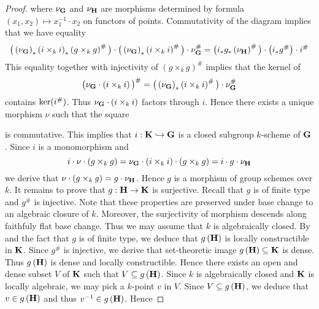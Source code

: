 \begin{proof}
where $\nu_{\mathbf{G}}$ and $\nu_{\mathbf{H}}$ are morphisms determined by formula $(x_1,x_2)\mapsto x_1^{-1}\cdot x_2$ on functors of points. Commutativity of the diagram implies that we have equality
$$\big(\left(\nu_{\mathbf{G}}\right)_*\left(i\times_k i\right)_*\left(g\times_k g\right)^{\#}\big) \cdot \big(\left(\nu_{\mathbf{G}}\right)_*\left(i\times_k i\right)^{\#} \big) \cdot \nu_{\mathbf{G}}^{\#} = \big(i_*g_* \left(\nu_{\mathbf{H}}\right)^{\#} \big) \cdot \big(i_*g^{\#} \big) \cdot i^{\#}$$
This equality together with injectivity of $\left(g\times_k g\right)^{\#}$ implies that the kernel of
$$\big(\nu_{\mathbf{G}}\cdot \left(i\times_k i\right)\big)^{\#} = \big(\left(\nu_{\mathbf{G}}\right)_*\left(i\times_k i\right)^{\#} \big) \cdot \nu_{\mathbf{G}}^{\#}$$
contains $\mathrm{ker}(i^{\#})$. Thus $\nu_{\mathbf{G}}\cdot \left(i\times_k i\right)$ factors through $i$. Hence there exists a unique morphism $\nu$ such that the square
\begin{center}
\end{center}
is commutative. This implies that $i:\mathbf{K} \hookrightarrow \mathbf{G}$ is a closed subgroup $k$-scheme of $\mathbf{G}$. Since $i$ is a monomorphism and
$$i\cdot \nu \cdot \left(g\times_k g\right) = \nu_{\mathbf{G}}\cdot \left(i\times_k i\right) \cdot \left(g\times_k g\right) = i \cdot g \cdot \nu_{\mathbf{H}}$$
we derive that $\nu \cdot \left(g\times_k g\right) = g\cdot \nu_{\mathbf{H}}$. Hence $g$ is a morphism of group schemes over $k$. It remains to prove that $g:\mathbf{H}\rightarrow \mathbf{K}$ is surjective. Recall that $g$ is of finite type and $g^{\#}$ is injective. Note that these properties are preserved under base change to an algebraic closure of $k$. Moreover, the surjectivity of morphism descends along faithfuly flat base change. Thus we may assume that $k$ is algebraically closed. By {\cite[Theorem 3.4]{Constructibleandlocallyconstructiblesets}} and the fact that $g$ is of finite type, we deduce that $g\left(\mathbf{H}\right)$ is locally constructible in $\mathbf{K}$. Since $g^{\#}$ is injective, we derive that set-theoretic image $g\left(\mathbf{H}\right)\subseteq \mathbf{K}$ is dense. Thus $g\left(\mathbf{H}\right)$ is dense and locally constructible. Hence there exists an open and dense subset $V$ of $\mathbf{K}$ such that $V\subseteq g\left(\mathbf{H}\right)$. Since $k$ is algebraically closed and $\mathbf{K}$ is locally algebraic, we may pick a $k$-point $v$ in $V$. Since $V\subseteq g\left(\mathbf{H}\right)$, we deduce that $v\in g\left(\mathbf{H}\right)$ and thus $v^{-1}\in g\left(\mathbf{H}\right)$. Hence

\end{proof}
